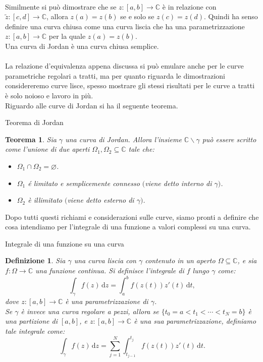 \documentclass[11pt]{book}
\theoremstyle{Definizione}
\newtheorem*{mydef}{Definizione}
\theoremstyle{TeoremaProposizioneLemmaCorollarioCongettura}
\newtheorem{myteo}{Teorema}[section]
\theoremstyle{OsservazioneNotaEsempio}
\newcommand{\C}{\mathbb{C}}
\newcommand{\tolto}{\smallsetminus}
\renewcommand{\d}{\mathrm{d}}
\newcommand{\dz}{\,\d z}
\newcommand{\dt}{\,\d t}
\begin{document}
\\
Similmente si può dimostrare che se $z:[a,b]\longrightarrow \C$ è in relazione con $\widetilde{z}:[c,d]\longrightarrow \C$, allora $z(a) = z(b)$ se e solo se $z(c) = z(d)$. Quindi ha senso definire una curva chiusa come una curva liscia che ha una parametrizzazione $z:[a,b]\longrightarrow \C$ per la quale $z(a) = z(b)$.\\
Una curva di Jordan è una curva chiusa semplice.\\
\\
La relazione d'equivalenza appena discussa si può emulare anche per le curve parametriche regolari a tratti, ma per quanto riguarda le dimostrazioni considereremo curve lisce, spesso mostrare gli stessi risultati per le curve a tratti è solo noioso e lavoro in più.
\\
Riguardo alle curve di Jordan si ha il seguente teorema.
\begin{boxteo}{Teorema di Jordan}
\begin{myteo}
Sia $\gamma$ una curva di Jordan. Allora l'insieme $\C \tolto \gamma$ può essere scritto come l'unione di due aperti $\Omega_1,\Omega_2\subseteq \C$ tale che:
\begin{itemize}
\item[$(i)$] $\Omega_1 \cap \Omega_2 = \varnothing$.
\item[$(ii)$] $\Omega_1$ é limitato e semplicemente connesso $($viene detto interno di $\gamma)$.
\item[$(iii)$] $\Omega_2$ è illimitato $($viene detto esterno di $\gamma)$.
\end{itemize}
\end{myteo}
\end{boxteo}
\noindent
Dopo tutti questi richiami e considerazioni sulle curve, siamo pronti a definire che cosa intendiamo per l'integrale di una funzione a valori complessi su una curva.
\begin{boxdef}{Integrale di una funzione su una curva}
\begin{mydef}
Sia $\gamma$ una curva liscia con $\gamma$ contenuto in un aperto $\Omega \subseteq \C$, e sia $f:\Omega \longrightarrow \C$ una funzione continua. Si definisce l'integrale di $f$ lungo $\gamma$ come:
$$
\int_\gamma f(z) \dz = \int_a^b f(z(t))z'(t) \dt,
$$
dove $z:[a,b]\longrightarrow \C$ è una parametrizzazione di $\gamma$.\\
Se $\gamma$ è invece una curva regolare a pezzi, allora se $\{t_0 = a < t_1 < \cdots < t_N = b\}$ è una partizione di $[a,b]$, e $z:[a,b]\longrightarrow \C$ è una sua parametrizzazione, definiamo tale integrale come:
$$
\int_\gamma f(z) \dz = \sum_{j = 1}^N \int_{t_{j-1}}^{t_j} f(z(t))z'(t)\dt.
$$
\end{mydef}
\end{boxdef}
\end{document}
